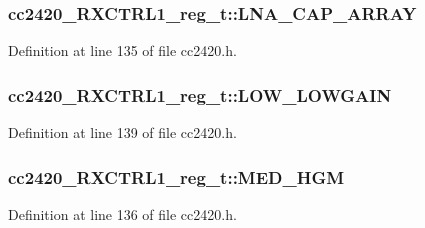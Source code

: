 \subsubsection[{\texorpdfstring{L\+N\+A\+\_\+\+C\+A\+P\+\_\+\+A\+R\+R\+AY}{LNA_CAP_ARRAY}}]{ cc2420\+\_\+\+R\+X\+C\+T\+R\+L1\+\_\+reg\+\_\+t\+::\+L\+N\+A\+\_\+\+C\+A\+P\+\_\+\+A\+R\+R\+AY}\hypertarget{structcc2420___r_x_c_t_r_l1__reg__t_a64dc2e933b1547e75f317b772661c30d}{}\label{structcc2420___r_x_c_t_r_l1__reg__t_a64dc2e933b1547e75f317b772661c30d}


Definition at line 135 of file cc2420.\+h.

\subsubsection[{\texorpdfstring{L\+O\+W\+\_\+\+L\+O\+W\+G\+A\+IN}{LOW_LOWGAIN}}]{ cc2420\+\_\+\+R\+X\+C\+T\+R\+L1\+\_\+reg\+\_\+t\+::\+L\+O\+W\+\_\+\+L\+O\+W\+G\+A\+IN}\hypertarget{structcc2420___r_x_c_t_r_l1__reg__t_ac35e306aaf6fc174c9bc84f0fc39d5f4}{}\label{structcc2420___r_x_c_t_r_l1__reg__t_ac35e306aaf6fc174c9bc84f0fc39d5f4}


Definition at line 139 of file cc2420.\+h.

\subsubsection[{\texorpdfstring{M\+E\+D\+\_\+\+H\+GM}{MED_HGM}}]{ cc2420\+\_\+\+R\+X\+C\+T\+R\+L1\+\_\+reg\+\_\+t\+::\+M\+E\+D\+\_\+\+H\+GM}\hypertarget{structcc2420___r_x_c_t_r_l1__reg__t_a1c994760e1176d38c81e0902f64316bd}{}\label{structcc2420___r_x_c_t_r_l1__reg__t_a1c994760e1176d38c81e0902f64316bd}


Definition at line 136 of file cc2420.\+h.

